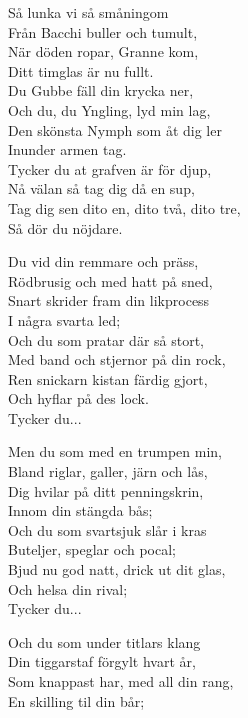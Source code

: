 \vspace{10pt}
Så lunka vi så småningom\\
Från Bacchi buller och tumult,\\
När döden ropar, Granne kom,\\
Ditt timglas är nu fullt.\\
Du Gubbe fäll din krycka ner,\\
Och du, du Yngling, lyd min lag,\\
Den skönsta Nymph som åt dig ler\\
Inunder armen tag.\\
Tycker du at grafven är för djup,\\
Nå välan så tag dig då en sup,\\
Tag dig sen dito en, dito två, dito tre,\\
Så dör du nöjdare.\par
\vspace{10pt}
Du vid din remmare och präss,\\
Rödbrusig och med hatt på sned,\\
Snart skrider fram din likprocess\\
I några svarta led;\\
Och du som pratar där så stort,\\
Med band och stjernor på din rock,\\
Ren snickarn kistan färdig gjort,\\
Och hyflar på des lock.\\
Tycker du...\par
\newpage
Men du som med en trumpen min,\\
Bland riglar, galler, järn och lås,\\
Dig hvilar på ditt penningskrin,\\
Innom din stängda bås;\\
Och du som svartsjuk slår i kras\\
Buteljer, speglar och pocal;\\
Bjud nu god natt, drick ut dit glas,\\
Och helsa din rival;\\
Tycker du...\par
\vspace{10pt}
Och du som under titlars klang\\
Din tiggarstaf förgylt hvart år,\\
Som knappast har, med all din rang,\\
En skilling til din bår;\\
